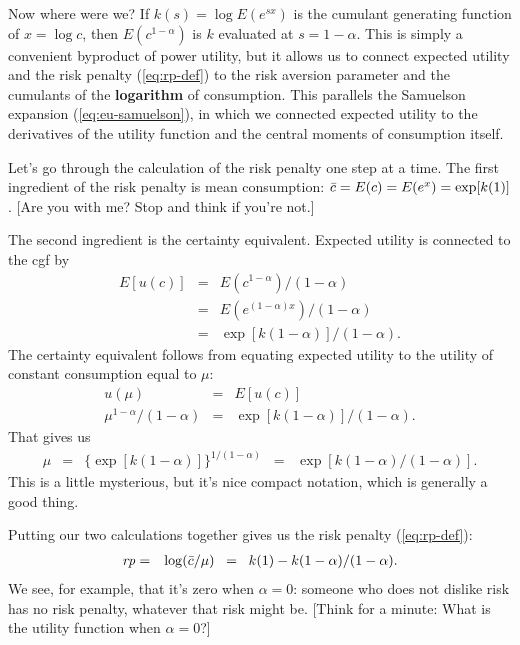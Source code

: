 \documentclass[11pt]{article}
\begin{document}
Now where were we?
If $k(s) = \log E (e^{sx})$ is the cumulant generating function of $x = \log c$,
then $E(c^{1-\alpha})$  is $k$ evaluated at $ s = 1-\alpha$.
This is simply a convenient byproduct of  power utility,
but it allows us to connect expected utility and the risk penalty (\ref{eq:rp-def})
to the risk aversion parameter and the cumulants of the {\bf logarithm} of consumption.
This parallels the Samuelson expansion (\ref{eq:eu-samuelson}),
in which we connected expected utility to the derivatives of the utility function
and the central moments of consumption itself.


Let's go through the calculation of the risk penalty one step at a time.
The first ingredient of the risk penalty is mean consumption:
$\bar{c} = E(c) = E (e^x) = \exp[k(1)]$.
[Are you with me?  Stop and think if you're not.]

The second ingredient is the certainty equivalent.
Expected utility is connected to the cgf by
\begin{eqnarray*}
    E[u(c)] &=&   E (c^{1-\alpha})/(1-\alpha) \\
            &=& E (e^{(1-\alpha) x})/(1-\alpha) \\
            &=&  \exp[k(1-\alpha)]/(1-\alpha) .
\end{eqnarray*}
The certainty equivalent follows from equating expected utility to the utility
of constant consumption equal to $\mu$:
\begin{eqnarray*}
    u (\mu) &=& E [u(c)]  \\
    \mu^{1-\alpha}/(1-\alpha)
            &=& \exp[k(1-\alpha)]/(1-\alpha) .
\end{eqnarray*}
That gives us
\begin{eqnarray*}
    \mu &=&  \big\{ \exp[k(1-\alpha)] \big\} ^{1/(1-\alpha)}  \;\;=\;\; \exp[k(1-\alpha)/(1-\alpha)]  .
\end{eqnarray*}
This is a little mysterious, but it's nice compact notation,
which is generally a good thing.

Putting our two calculations together gives us the risk penalty (\ref{eq:rp-def}):
\begin{eqnarray*}
    \mbox{\em rp\/} &=& \log (\bar{c}/\mu)  \;\;=\;\; k(1) -  k(1-\alpha) / (1-\alpha) .
\end{eqnarray*}
We see, for example, that it's zero when $\alpha = 0$:
someone who does not dislike risk has no risk penalty,
whatever that risk might be.
[Think for a minute:  What is the utility function when $\alpha = 0$?]
\end{document}
